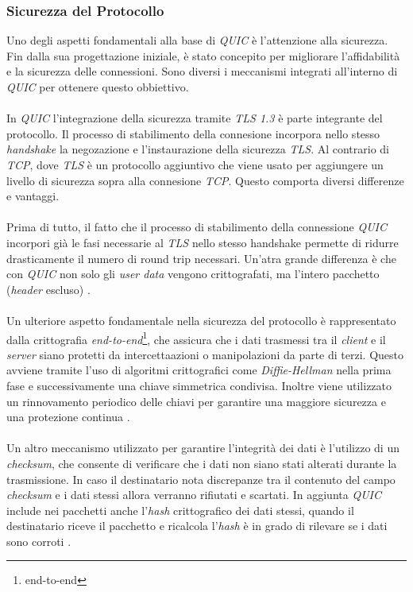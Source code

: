 \subsubsection{Sicurezza del Protocollo}
Uno degli aspetti fondamentali alla base di \emph{QUIC} è l'attenzione alla sicurezza. Fin dalla sua progettazione iniziale, è stato concepito per migliorare l'affidabilità e la sicurezza delle connessioni. 
Sono diversi i meccanismi integrati all'interno di \emph{QUIC} per ottenere questo obbiettivo.
\\\\
In \emph{QUIC} l'integrazione della sicurezza tramite \emph{TLS 1.3} è parte integrante del protocollo. Il processo di stabilimento della connesione incorpora nello stesso \emph{handshake} la negozazione e l'instaurazione della sicurezza \emph{TLS}. 
Al contrario di \emph{TCP}, dove \emph{TLS} è un protocollo aggiuntivo che viene usato per aggiungere un livello di sicurezza sopra alla connesione \emph{TCP}. Questo comporta diversi differenze e vantaggi.
\\\\
Prima di tutto, il fatto che il processo di stabilimento della connessione \emph{QUIC} incorpori già le fasi necessarie al \emph{TLS} nello stesso handshake permette di ridurre drasticamente il numero di round trip necessari.
Un'atra grande differenza è che con \emph{QUIC} non solo gli \emph{user data} vengono crittografati, ma l'intero pacchetto (\emph{header} escluso) \cite{site:Explaining-QUIC}.
\\\\
Un ulteriore aspetto fondamentale nella sicurezza del protocollo è rappresentato dalla crittografia \emph{end-to-end}\footnote{\gls{end-to-end}}, che assicura che i dati trasmessi tra il \emph{client} e il \emph{server} siano protetti da intercettaazioni o manipolazioni da parte di terzi.
Questo avviene tramite l'uso di algoritmi crittografici come \emph{Diffie-Hellman} nella prima fase e successivamente una chiave simmetrica condivisa. Inoltre viene utilizzato un rinnovamento periodico delle chiavi per garantire una maggiore sicurezza e una protezione continua \cite{site:quic-security}.
\\\\
Un altro meccanismo utilizzato per garantire l'integrità dei dati è l'utilizzo di un \emph{checksum}, che consente di verificare che i dati non siano stati alterati durante la trasmissione. In caso il destinatario nota discrepanze tra il contenuto del campo \emph{checksum} e i dati stessi allora verranno rifiutati e scartati.
In aggiunta \emph{QUIC} include nei pacchetti anche l'\emph{hash} crittografico dei dati stessi, quando il destinatario riceve il pacchetto e ricalcola l'\emph{hash} è in grado di rilevare se i dati sono corroti \cite{site:quic-security}.

